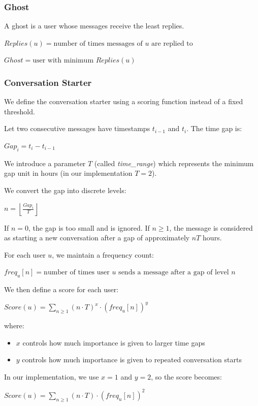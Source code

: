 \documentclass[12pt]{article}
\begin{document}
\subsubsection{Ghost}

A ghost is a user whose messages receive the least replies.

$Replies(u) = \text{number of times messages of } u \text{ are replied to}$

$Ghost = \text{user with minimum } Replies(u)$

\subsubsection{Conversation Starter}

We define the conversation starter using a scoring function instead of a fixed threshold.

Let two consecutive messages have timestamps $t_{i-1}$ and $t_i$. The time gap is:

$Gap_i = {t_i - t_{i-1}}$

We introduce a parameter $T$ (called \textit{time\_range}) which represents the minimum gap unit in hours (in our implementation $T = 2$).

We convert the gap into discrete levels:

$n = \left\lfloor \frac{Gap_i}{T} \right\rfloor$

If $n = 0$, the gap is too small and is ignored. If $n \geq 1$, the message is considered as starting a new conversation after a gap of approximately $nT$ hours.

For each user $u$, we maintain a frequency count:

$freq_u[n] = \text{number of times user } u \text{ sends a message after a gap of level } n$

We then define a score for each user:

$Score(u) = \sum_{n \geq 1} (n \cdot T)^x \cdot (freq_u[n])^y$

where:
\begin{itemize}
\item $x$ controls how much importance is given to larger time gaps
\item $y$ controls how much importance is given to repeated conversation starts
\end{itemize}

In our implementation, we use $x = 1$ and $y = 2$, so the score becomes:

$Score(u) = \sum_{n \geq 1} (n \cdot T) \cdot (freq_u[n])^2$
\end{document}

